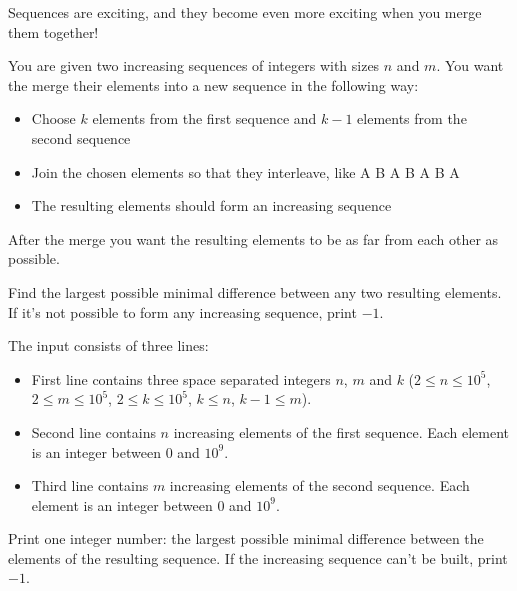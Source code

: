 \problemname{\problemyamlname}


\newcommand{\minn}{2}
\newcommand{\maxn}{10^{5}}
\newcommand{\minm}{2}
\newcommand{\maxm}{10^{5}}
\newcommand{\mink}{2}
\newcommand{\maxk}{10^{5}}
\newcommand{\mina}{0}
\newcommand{\maxa}{10^{9}}

Sequences are exciting, and they become even more exciting when you merge them together!

You are given two increasing sequences of integers with sizes $n$ and $m$. You want the merge their elements into a new sequence in the following way:
\begin{itemize}
    \item Choose $k$ elements from the first sequence and $k-1$ elements from the second sequence
    \item Join the chosen elements so that they interleave, like A B A B A B A
    \item The resulting elements should form an increasing sequence
\end{itemize}

After the merge you want the resulting elements to be as far from each other as possible.

Find the largest possible minimal difference between any two resulting elements. If it's not possible to form any increasing sequence, print $-1$.

\begin{Input}
    The input consists of three lines:
    \begin{itemize}
        \item First line contains three space separated integers $n$, $m$ and $k$ ($\minn \leq n\leq \maxn$, $\minm \leq m\leq \maxm$, $\mink \leq k\leq \maxk$, $k \leq n$, $k-1 \leq m$).
        \item Second line contains $n$ increasing elements of the first sequence. Each element is an integer between $\mina$ and $\maxa$.
        \item Third line contains $m$ increasing elements of the second sequence. Each element is an integer between $\mina$ and $\maxa$.
    \end{itemize}
\end{Input}

\begin{Output}
    Print one integer number: the largest possible minimal difference between the elements of the resulting sequence. If the increasing sequence can't be built, print $-1$.
\end{Output}
